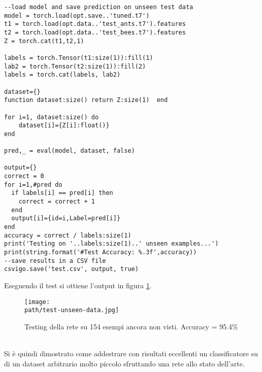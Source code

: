 \begin{lstlisting}[language={[5.2]Lua}]
--load model and save prediction on unseen test data
model = torch.load(opt.save..'tuned.t7')
t1 = torch.load(opt.data..'test_ants.t7').features
t2 = torch.load(opt.data..'test_bees.t7').features
Z = torch.cat(t1,t2,1)

labels = torch.Tensor(t1:size(1)):fill(1)
lab2 = torch.Tensor(t2:size(1)):fill(2)
labels = torch.cat(labels, lab2)

dataset={}
function dataset:size() return Z:size(1)  end

for i=1, dataset:size() do
    dataset[i]={Z[i]:float()}
end

pred,_ = eval(model, dataset, false)

output={}
correct = 0
for i=1,#pred do
  if labels[i] == pred[i] then
    correct = correct + 1
  end
  output[i]={id=i,Label=pred[i]}
end
accuracy = correct / labels:size(1)
print('Testing on '..labels:size(1)..' unseen examples...')
print(string.format('#Test Accuracy: %.3f',accuracy))
--save results in a CSV file
csvigo.save('test.csv', output, true)
\end{lstlisting}

Eseguendo il test si ottiene l'output in figura \ref{fig:res-test}. 
\begin{figure}[h!]
 \centering
 \texttt{[image: \\path/test-unseen-data.jpg]} 
 \caption{Testing della rete su 154 esempi ancora non visti. Accuracy = 95.4\%}
 \label{fig:res-test}
\end{figure}
\\

Si è quindi dimostrato come addestrare con risultati eccellenti un classificatore su di un dataset arbitrario molto piccolo sfruttando una rete allo stato dell'arte. 

